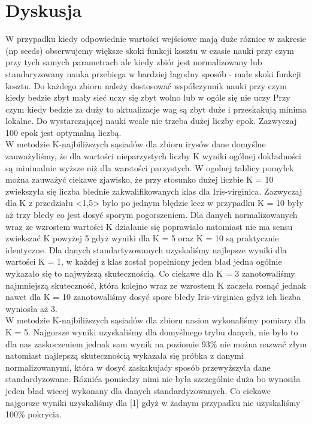\documentclass{classrep}
\begin{document}
    \section{Dyskusja}
    {
        W przypadku kiedy odpowiednie wartości wejściowe mają duże róznice w zakresie (np seeds)
        obserwujemy większe skoki funkcji kosztu w czasie nauki przy czym przy tych samych parametrach
        ale kiedy zbiór jest normalizowany lub standaryzowany nauka przebiega w bardziej łagodny sposób -
        małe skoki funkcji kosztu. Do każdego zbioru należy dostosować współczynnik nauki
        przy czym kiedy bedzie zbyt mały sieć uczy się zbyt wolno lub w ogóle się nie uczy
        Przy czym kiedy bedzie za duży to aktualizacje wag są zbyt duże i przeskakują minima lokalne.
        Do wystarczającej nauki wcale nie trzeba dużej liczby epok. Zazwyczaj 100 epok jest optymalną liczbą.\\

        W metodzie K-najbiliższych sąsiadów dla zbioru irysów dane domyślne zauważyliśmy, że dla wartości nieparzystych liczby
        K wyniki ogólnej dokładności są minimalnie wyższe niż dla warstości parzystych. W ogolnej tablicy pomyłek
        można zauważyć ciekawe zjawisko, że przy stosunko dużej liczbie K = 10 zwiekszyła się liczba błednie
        zakwalifikowanych klas dla Iris-virginica. Zazwyczaj dla K z przedziału <1,5> było po jednym błędzie
        lecz w przypadku K = 10 były aż trzy błedy co jest dosyć sporym pogorszeniem. Dla danych normalizowanych
        wraz ze wzrostem wartości K działanie się poprawiało natomiast nie ma sensu zwiekszać K powyżej 5 gdyż
        wyniki dla K = 5 oraz K = 10 są praktycznie identyczne. Dla danych standartyzowanych uzyskaliśmy najlepsze
        wyniki dla wartości K = 1, w każdej z klas został popełniony jeden bład jedna ogólnie wykazało się
        to najwyższą skutecznością. Co ciekawe dla K = 3 zanotowaliśmy najmniejszą skuteczność, która kolejno wraz
        ze wzrostem K zaczeła rosnąć jednak nawet dla K = 10 zanotowaliśmy dosyć spore błedy Iris-virginica gdyż
        ich liczba wyniosła aż 3. \\

        W metodzie K-najbiliższych sąsiadów dla zbioru nasion wykonaliśmy pomiary dla K = 5. Najgorsze wyniki uzyskaliśmy
        dla domyślnego trybu danych, nie bylo to dla nas zaskoczeniem jednak sam wynik na poziomie 93\% nie można nazwać
    złym natomiast najlepszą skutecznością wykazała się próbka z danymi normalizowanymi, która w dosyć zaskakujaćy
    sposób przewyższyła dane standardyzowane. Róznića pomiedzy nimi nie była szczególnie duża bo wynosiła jeden bład
    wiecej wykonany dla danych standardyzowanych. Co ciekawe najgorsze wyniki uzyskaliśmy dla [1] gdyż w żadnym
    przypadku nie uzyskaliśmy 100\% pokrycia.\\

}
\end{document}

